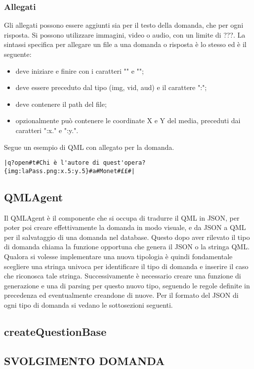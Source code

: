 \documentclass[a4paper, titlepage]{article}
\begin{document}
	\subsubsection{Allegati}
	Gli allegati possono essere aggiunti sia per il testo della domanda, che per ogni risposta.
	Si possono utilizzare immagini, video o audio, con un limite di ???.
	La sintassi specifica per allegare un file a una domanda o risposta è lo stesso ed è il seguente:
	\begin{itemize}
		\item deve iniziare e finire con i caratteri "{" e "}";
		\item deve essere preceduto dal tipo (img, vid, aud) e il carattere ":";
		\item deve contenere il path del file;
		\item opzionalmente può contenere le coordinate X e Y del media, preceduti dai caratteri ":x." e ":y.".
	\end{itemize}
	Segue un esempio di QML con allegato per la domanda.
	\begin{verbatim}|q?open#t#Chi è l'autore di quest'opera?{img:laPass.png:x.5:y.5}#a#Monet#££#|\end{verbatim}
	
	\subsection{QMLAgent}
	Il QMLAgent è il componente che si occupa di tradurre il QML in JSON, per poter poi creare effettivamente la domanda in modo visuale,
	e da JSON a QML per il salvataggio di una domanda nel database.
	Questo dopo aver rilevato il tipo di domanda chiama la funzione opportuna che genera il JSON o la stringa QML.
	Qualora si volesse implementare una nuova tipologia è quindi fondamentale scegliere una stringa univoca per identificare il tipo di domanda e inserire il caso che riconosca tale stringa.
	Successivamente è necessario creare una funzione di generazione e una di parsing per questo nuovo tipo, seguendo le regole definite in precedenza ed eventualmente creandone di nuove.
	Per il formato del JSON di ogni tipo di domanda si vedano le sottosezioni seguenti.
	
	\subsection{createQuestionBase}
	
	\subsection{SVOLGIMENTO DOMANDA}
	
\end{document}
